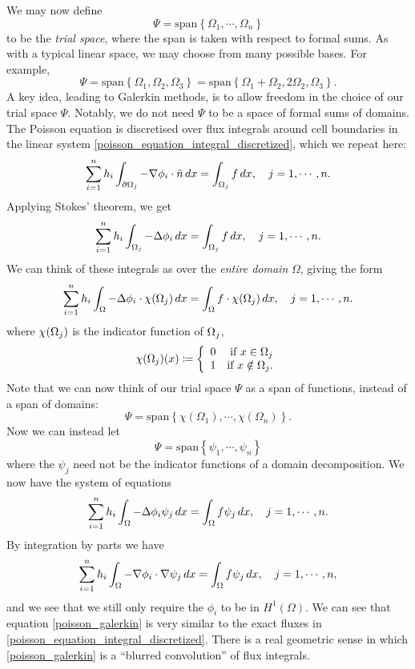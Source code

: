 We may now define
    $$\Psi = \text{span}\left\{\Omega_1,\cdots,\Omega_n\right\}$$
to be the \textit{trial space}, where the span is taken with respect to formal sums. As with a typical linear space,
we may choose from many possible bases. For example,
    $$\Psi = \text{span}\left\{\Omega_1, \Omega_2, \Omega_3\right\} =
    \text{span}\left\{\Omega_1 + \Omega_2, 2\Omega_2, \Omega_3\right\}.$$
A key idea, leading to Galerkin methods, is to allow freedom in the choice of our trial space $\Psi$.
Notably, we do not need $\Psi$ to be a space of formal sums of domains.
The Poisson equation is discretised over flux integrals around cell boundaries in the linear system \eqref{poisson_equation_integral_discretized},
which we repeat here:
\begin{align*}
    \sum_{i=1}^n h_i\int_{{\partial\Omega}_j} -\nabla \phi_i \cdot \hat{n}\,dx = \int_{{\Omega}_j} f\,dx,\quad j=1,\cdots,n.
\end{align*}
Applying Stokes' theorem, we get
\begin{align*}
    \sum_{i=1}^n h_i\int_{{\Omega}_j} -\Delta \phi_i \,dx = \int_{{\Omega}_j} f\,dx,\quad j=1,\cdots,n.
\end{align*}
We can think of these integrals as over the \textit{entire domain} $\Omega$, giving the form
\begin{align*}
    \sum_{i=1}^n h_i\int_{{\Omega}} -\Delta \phi_i\cdot \chi({\Omega}_j)\,dx = \int_{{\Omega}} f\cdot\chi({\Omega}_j)\,dx,\quad j=1,\cdots,n.
\end{align*}
where $\chi({\Omega}_j)$ is the indicator function of ${\Omega}_j$,
\begin{align*}
    \chi({\Omega}_j)(x) \coloneqq \left\{\begin{array}{lr}
        0 &\text{if $x \in {\Omega}_j$}\\
        1 &\text{if $x \notin {\Omega}_j$.}\\
        \end{array}\right.
\end{align*}
Note that we can now think of our trial space $\Psi$ as a span of functions, instead of a span of domains:
    $$\Psi = \text{span}\left\{\chi(\Omega_1),\cdots,\chi(\Omega_n)\right\}.$$
Now we can instead let
    $$\Psi = \text{span}\left\{\psi_1,\cdots,\psi_n\right\}$$
where the $\psi_j$
need not be the indicator functions of a domain decomposition. We now have the system of equations
\begin{align*}
    \sum_{i=1}^n h_i\int_{{\Omega}} -\Delta \phi_i \psi_j\,dx = \int_{{\Omega}} f\psi_j\,dx,\quad j=1,\cdots,n.
\end{align*}
By integration by parts we have
\begin{equation}\label{poisson_galerkin}
    \sum_{i=1}^n h_i\int_{{\Omega}} -\nabla \phi_i \cdot \nabla \psi_j\,dx = \int_{{\Omega}} f\psi_j\,dx,\quad j=1,\cdots,n,
\end{equation}
and we see that we still only require the $\phi_i$ to be in $H^1(\Omega)$.
We can see that equation \eqref{poisson_galerkin} is very similar to the exact fluxes in \eqref{poisson_equation_integral_discretized}.
There is a real geometric sense in which \eqref{poisson_galerkin} is a ``blurred convolution'' of flux integrals.

